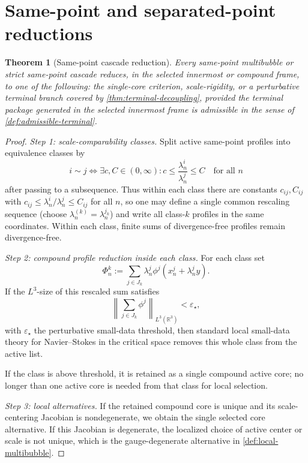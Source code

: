 \documentclass[11pt]{amsart}
\theoremstyle{plain}
\newtheorem{theorem}{Theorem}[section]
\theoremstyle{definition}
\theoremstyle{remark}
\begin{document}
\section{Same-point and separated-point reductions}

\begin{theorem}[Same-point cascade reduction]\label{thm:same-point-reduction}
Every same-point multibubble or strict same-point cascade reduces, in the
selected innermost or compound frame, to one of the following: the single-core
criterion, scale-rigidity, or a perturbative terminal branch covered by
\cref{thm:terminal-decoupling}, provided the terminal package generated in the
selected innermost frame is admissible in the sense of
\cref{def:admissible-terminal}.
\end{theorem}

\begin{proof}
\noindent\textit{Step 1: scale-comparability classes.}
Split active same-point profiles into equivalence classes by
\[
  i\sim j \iff \exists c,C\in(0,\infty):
  c\le \frac{\lambda^i_n}{\lambda^j_n}\le C \quad \text{for all }n
\]
after passing to a subsequence.
Thus within each class there are constants \(c_{ij},C_{ij}\) with
\(c_{ij}\le\lambda^i_n/\lambda^j_n\le C_{ij}\) for all \(n\), so one may define
a single common rescaling sequence (choose \(\lambda_n^{(k)}=\lambda_n^{j_k}\)) and write
all class-\(k\) profiles in the same coordinates.
Within each class, finite sums of divergence-free profiles remain divergence-free.

\smallskip
\noindent\textit{Step 2: compound profile reduction inside each class.}
For each class set
\[
  \Phi^k_n:=\sum_{j\in J_k}\lambda^j_n\phi^j(x_n^j+\lambda^j_n y).
\]
If the \(L^3\)-size of this rescaled sum satisfies
\[
  \left\|\sum_{j\in J_k}\phi^j\right\|_{L^3(\mathbb R^3)}<\varepsilon_\star,
\]
with \(\varepsilon_\star\) the perturbative small-data threshold, then standard local
small-data theory for Navier--Stokes in the critical space removes this whole class
from the active list.

If the class is above threshold, it is retained as a single compound active core;
no longer than one active core is needed from that class for local selection.

\smallskip
\noindent\textit{Step 3: local alternatives.}
If the retained compound core is unique and its scale-centering Jacobian is
nondegenerate, we obtain the single selected core alternative.
If this Jacobian is degenerate, the localized choice of active center or scale is
not unique, which is the gauge-degenerate alternative in
\cref{def:local-multibubble}.


\end{proof}
\end{document}
